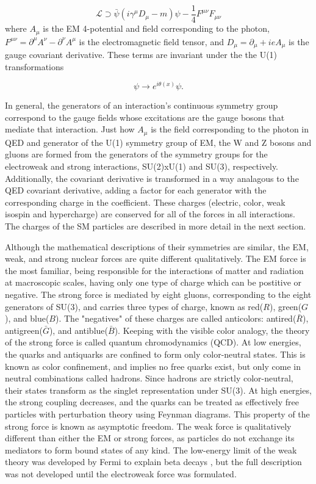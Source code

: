 \begin{equation}
\mathcal{L} \supset \bar{\psi} ( i \gamma^\mu D_\mu - m ) \psi - \frac{1}{4} F^{\mu\nu}F_{\mu\nu}
\end{equation}
where $A_\mu$ is the EM 4-potential and field corresponding to the photon, $F^{\mu\nu} = \partial^\mu A ^\nu - \partial^\nu A^\mu$ is the electromagnetic field tensor, and $D_\mu = \partial_\mu + i e A_\mu$ is the gauge covariant derivative. These terms are invariant under the the U(1) transformations

\begin{equation}
\psi \rightarrow e^{i\theta(x)} \psi.
\end{equation}

In general, the generators of an interaction's continuous symmetry group correspond to the gauge fields whose excitations are the gauge bosons that mediate that interaction. Just how $A_\mu$ is the field corresponding to the photon in QED and generator of the U(1) symmetry group of EM, the W and Z bosons and gluons are formed from the generators of the symmetry groups for the electroweak and strong interactions, SU(2)xU(1) and SU(3), respectively. Additionally, the covariant derivative is transformed in a way analagous to the QED covariant derivative, adding a factor for each generator with the corresponding charge in the coefficient. These charges (electric, color, weak isospin and hypercharge) are conserved for all of the forces in all interactions. The charges of the SM particles are described in more detail in the next section.

\indent Although the mathematical descriptions of their symmetries are similar, the EM, weak, and strong nuclear forces are quite different qualitatively. The EM force is the most familiar, being responsible for the interactions of matter and radiation at macroscopic scales, having only one type of charge which can be postitive or negative. The strong force is mediated by eight gluons, corresponding to the eight generators of SU(3), and carries three types of charge, known as red($R$), green($G$), and blue($B$). The "negatives" of these charges are called anticolors: antired($\bar{R}$), antigreen($\bar{G}$), and antiblue($\bar{B}$). Keeping with the visible color analogy, the theory of the strong force is called quantum chromodynamics (QCD). At low energies, the quarks and antiquarks are confined to form only color-neutral states. This is known as color confinement, and implies no free quarks exist, but only come in neutral combinations called hadrons. Since hadrons are strictly color-neutral, their states transform as the singlet representation under SU(3). At high energies, the strong coupling decreases, and the quarks can be treated as effectively free particles with perturbation theory using Feynman diagrams. This property of the strong force is known as asymptotic freedom. The weak force is qualitatively different than either the EM or strong forces, as particles do not exchange its mediators to form bound states of any kind. The low-energy limit of the weak theory was developed by Fermi to explain beta decays \cite{}, but the full description was not developed until the electroweak force was formulated. 

